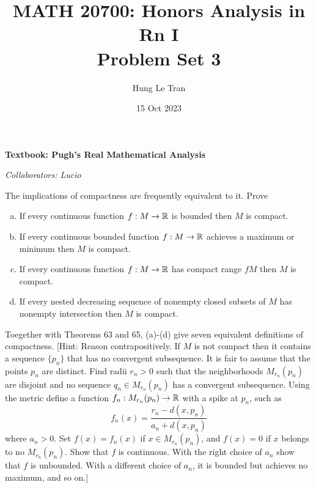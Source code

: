 \documentclass[a4paper, 12pt]{article}
\title{MATH 20700: Honors Analysis in Rn I \\ \large Problem Set 3}
\date{15 Oct 2023}
\author{Hung Le Tran}
\begin{document}
\maketitle
\setcounter{section}{3}
\textbf{Textbook: Pugh's Real Mathematical Analysis}

\textit{Collaborators: Lucio}
\begin{problem} [2.118*]
The implications of compactness are frequently equivalent to it. Prove
\begin{enumerate} [(a)]
    \item If every continuous function $f: M \to \mathbb{R}$ is bounded then $M$ is compact.
    \item If every continuous bounded function $f: M \to \mathbb{R}$ achieves a maximum or minimum then $M$ is compact.
    \item If every continuous function $f: M \to \mathbb{R}$ has compact range $fM$ then $M$ is compact.
    \item If every nested decreasing sequence of nonempty closed subsets of $M$ has nonempty intersection then $M$ is compact.
\end{enumerate}

Toegether with Theorems 63 and 65, (a)-(d) give seven equivalent definitions of compactness. [Hint: Reason contrapositively. If $M$ is not compact then it contains a sequence $\{p_n\}$ that has no convergent subsequence. It is fair to assume that the points $p_n$ are distinct. Find radii $r_n > 0$ such that the neighborhoods $M_{r_n}(p_n)$ are disjoint and no sequence $q_n \in M_{r_n}(p_n)$ has a convergent subsequence. Using the metric define a function $f_n: M_{r_n} (p_n) \to \mathbb{R}$ with a spike at $p_n$, such as \[
            f_n(x) = \frac{r_n - d(x, p_n)}{a_n + d(x, p_n)}
        \]
        where $a_n > 0$. Set $f(x) = f_n(x)$ if $x \in M_{r_n}(p_n)$, and $f(x) = 0$ if $x$ belongs to no $M_{r_n}(p_n)$. Show that $f$ is continuous. With the right choice of $a_n$ show that $f$ is unbounded. With a different choice of $a_n$, it is bounded but achieves no maximum, and so on.]
\end{problem}
\end{document}

